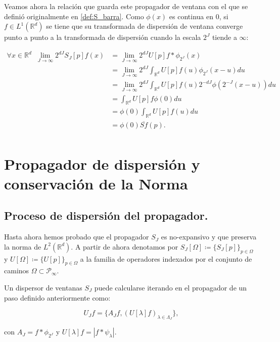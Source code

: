 \noindent Veamos ahora la relación que guarda este propagador de ventana con el que se definió originalmente en \autoref{def:S_barra}. Como $\phi(x)$ es continua en $0$, si $f\in L^1 (\mathbb{R}^d)$ se tiene que su transformada de dispersión de ventana converge punto a punto a la transformada de dispersión cuando la escala $2^J$ tiende a $\infty$: 

\begin{align*}
    \forall x \in \mathbb{R}^d \;\; \lim_{J \rightarrow \infty} 2^{dJ} S_J[p]f(x) 
    &=\lim_{J \rightarrow \infty} 2^{dJ} U[p]f \ast \phi_{2^J}(x) \\
    &=\lim_{J \rightarrow \infty} 2^{dJ} \int_{\mathbb{R}^d} U[p]f(u)\phi_{2^J}(x-u) du \\
    &=\lim_{J \rightarrow \infty} 2^{dJ} \int_{\mathbb{R}^d} U[p]f(u) 2^{-dJ} \phi(2^{-J}(x-u)) du   \\
    &= \int_{\mathbb{R}^d} U[p]f \phi(0) du  \\
    &=\phi(0)\int_{\mathbb{R}^d}U[p]f(u) du \\
    &= \phi(0)\overline{Sf}(p).\\ 
\end{align*}

\section{Propagador de dispersión y conservación de la Norma} \label{ch:seccion13}


\subsection{Proceso de dispersión del propagador.}

\noindent Hasta ahora hemos probado que el propagador $S_J$ es no-expansivo y que preserva la norma de $L^2(\mathbb{R}^d)$. A partir de ahora denotamos por $S_J[\Omega] \coloneqq \lbrace S_J[p] \rbrace_{p\in\Omega}$ y $U[\Omega]\coloneqq \lbrace U[p] \rbrace_{p\in\Omega}$ a la familia de operadores indexados por el conjunto de caminos $\Omega \subset \mathcal{P}_\infty$.

\medskip

\noindent Un dispersor de ventanas $S_J$ puede calcularse iterando en el propagador de un paso definido anteriormente como: 

$$U_Jf=\lbrace A_Jf, (U[\lambda]f)_{\lambda\in\Lambda_J} \rbrace,$$

\noindent con $A_J=f\ast \phi_{2^J}$ y $U[\lambda]f=\left| f\ast \psi_\lambda \right|$. 

